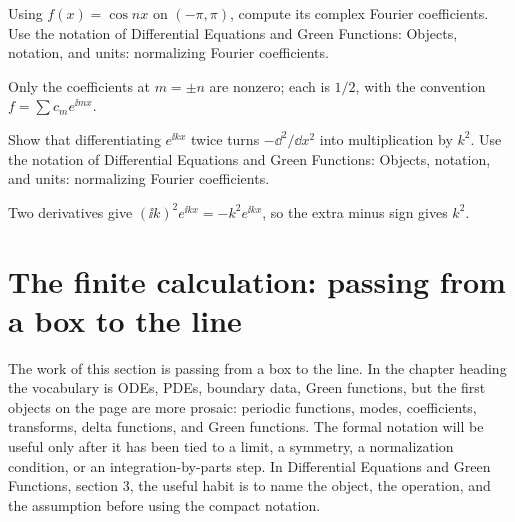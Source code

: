 \begin{exercise}
Using \(f(x)=\cos nx\) on \((-\pi,\pi)\), compute its complex Fourier coefficients.  Use the notation of Differential Equations and Green Functions: Objects, notation, and units: normalizing Fourier coefficients.
\begin{answer}
Only the coefficients at \(m=\pm n\) are nonzero; each is \(1/2\), with the convention \(f=\sum c_me^{\ii mx}\).
\end{answer}
\end{exercise}

\begin{exercise}
Show that differentiating \(e^{\ii kx}\) twice turns \(-\dd^2/\dd x^2\) into multiplication by \(k^2\).  Use the notation of Differential Equations and Green Functions: Objects, notation, and units: normalizing Fourier coefficients.
\begin{answer}
Two derivatives give \((\ii k)^2e^{\ii kx}=-k^2e^{\ii kx}\), so the extra minus sign gives \(k^2\).
\end{answer}
\end{exercise}



\section{The finite calculation: passing from a box to the line}













The work of this section is passing from a box to the line.  In the chapter heading the vocabulary is ODEs, PDEs, boundary data, Green functions, but the first objects on the page are more prosaic: periodic functions, modes, coefficients, transforms, delta functions, and Green functions.  The formal notation will be useful only after it has been tied to a limit, a symmetry, a normalization condition, or an integration-by-parts step.  In Differential Equations and Green Functions, section 3, the useful habit is to name the object, the operation, and the assumption before using the compact notation.

